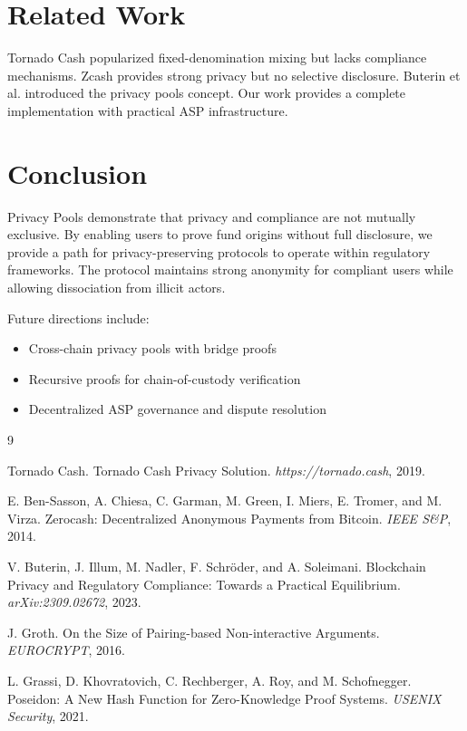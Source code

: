 \documentclass[11pt,a4paper]{article}
\theoremstyle{definition}
\begin{document}
\section{Related Work}

Tornado Cash \cite{tornado} popularized fixed-denomination mixing but lacks compliance mechanisms. Zcash \cite{zcash} provides strong privacy but no selective disclosure. Buterin et al. \cite{privacypools} introduced the privacy pools concept. Our work provides a complete implementation with practical ASP infrastructure.

\section{Conclusion}

Privacy Pools demonstrate that privacy and compliance are not mutually exclusive. By enabling users to prove fund origins without full disclosure, we provide a path for privacy-preserving protocols to operate within regulatory frameworks. The protocol maintains strong anonymity for compliant users while allowing dissociation from illicit actors.

Future directions include:
\begin{itemize}
    \item Cross-chain privacy pools with bridge proofs
    \item Recursive proofs for chain-of-custody verification
    \item Decentralized ASP governance and dispute resolution
\end{itemize}


\begin{thebibliography}{9}

Tornado Cash.
Tornado Cash Privacy Solution.
\textit{https://tornado.cash}, 2019.

E. Ben-Sasson, A. Chiesa, C. Garman, M. Green, I. Miers, E. Tromer, and M. Virza.
Zerocash: Decentralized Anonymous Payments from Bitcoin.
\textit{IEEE S\&P}, 2014.

V. Buterin, J. Illum, M. Nadler, F. Schr\"oder, and A. Soleimani.
Blockchain Privacy and Regulatory Compliance: Towards a Practical Equilibrium.
\textit{arXiv:2309.02672}, 2023.

J. Groth.
On the Size of Pairing-based Non-interactive Arguments.
\textit{EUROCRYPT}, 2016.

L. Grassi, D. Khovratovich, C. Rechberger, A. Roy, and M. Schofnegger.
Poseidon: A New Hash Function for Zero-Knowledge Proof Systems.
\textit{USENIX Security}, 2021.

\end{thebibliography}
\end{document}
